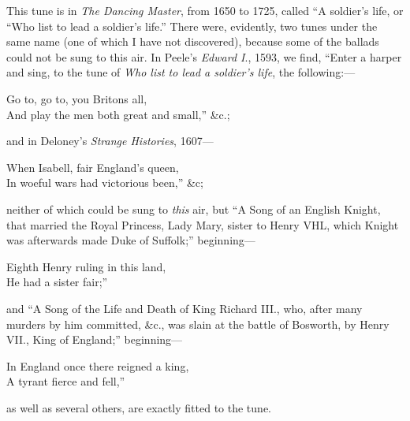 


This tune is in \textit{The Dancing Master}, from 1650 to 1725, called “A soldier’s
life, or “Who list to lead a soldier’s life.” There were, evidently, two tunes
under the same name (one of which I have not discovered), because some of the
ballads could not be sung to this air. In Peele’s \textit{Edward I}., 1593, we find,
“Enter a harper and sing, to the tune of \textit{Who list to lead a soldier’s life}, the
following:—
\settowidth{\versewidth}{And play the men both great and small,” \&c.}
\begin{scverse}Go to, go to, you Britons all,\\
And play the men both great and small,” \&c.;
\end{scverse}
and in Deloney’s \textit{Strange Histories}, 1607—
\settowidth{\versewidth}{In woeful wars had victorious been,” \&c;}
\begin{scverse}When Isabell, fair England’s queen,\\
In woeful wars had victorious been,” \&c;
\end{scverse}
neither of which could be sung to \textit{this} air, but “A Song of an English Knight,
that married the Royal Princess, Lady Mary, sister to Henry VHL, which Knight
was afterwards made Duke of Suffolk;” beginning—
\settowidth{\versewidth}{“Eighth Henry ruling in this land,}
\begin{scverse}\begin{altverse}
Eighth Henry ruling in this land,\\
He had a sister fair;”
\end{altverse}
\end{scverse}
and “A Song of the Life and Death of King Richard III., who, after many
murders by him committed, \&c., was slain at the battle of Bosworth, by
Henry VII., King of England;” beginning—
\settowidth{\versewidth}{“In England once there reigned a king,}
\begin{scverse}\begin{altverse}
In England once there reigned a king,\\
A tyrant fierce and fell,”
\end{altverse}
\end{scverse}
as well as several others, are exactly fitted to the tune.

